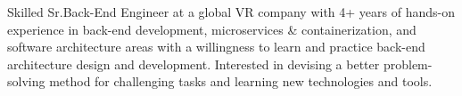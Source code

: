 

\begin{cvparagraph}

Skilled Sr.Back-End Engineer at a global VR company with 4+ years of hands-on experience in back-end development, microservices \& containerization, and software architecture areas with a willingness to learn and practice back-end architecture design and development. Interested in devising a better problem-solving method for challenging tasks and learning new technologies and tools.
\end{cvparagraph}
